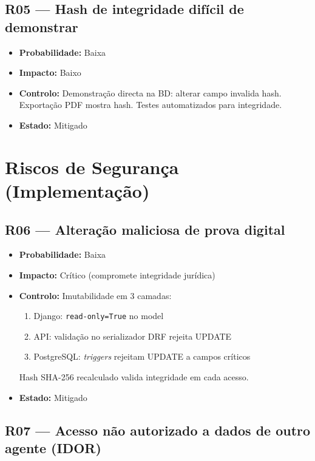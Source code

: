 \documentclass[a4paper,11pt]{article}
\begin{document}
\subsection*{R05 — Hash de integridade difícil de demonstrar}

\begin{itemize}[nosep]
    \item \textbf{Probabilidade:} Baixa
    \item \textbf{Impacto:} Baixo
    \item \textbf{Controlo:} Demonstração directa na BD: alterar campo invalida hash.
          Exportação PDF mostra hash. Testes automatizados para integridade.
    \item \textbf{Estado:} Mitigado
\end{itemize}

\section{Riscos de Segurança (Implementação)}

\subsection*{R06 — Alteração maliciosa de prova digital}

\begin{itemize}[nosep]
    \item \textbf{Probabilidade:} Baixa
    \item \textbf{Impacto:} Crítico (compromete integridade jurídica)
    \item \textbf{Controlo:} Imutabilidade em 3 camadas:
    \begin{enumerate}[nosep, leftmargin=*]
        \item Django: \texttt{read-only=True} no model
        \item API: validação no serializador DRF rejeita UPDATE
        \item PostgreSQL: \emph{triggers} rejeitam UPDATE a campos críticos
    \end{enumerate}
    Hash SHA-256 recalculado valida integridade em cada acesso.
    \item \textbf{Estado:} Mitigado
\end{itemize}

\subsection*{R07 — Acesso não autorizado a dados de outro agente (IDOR)}
\end{document}
